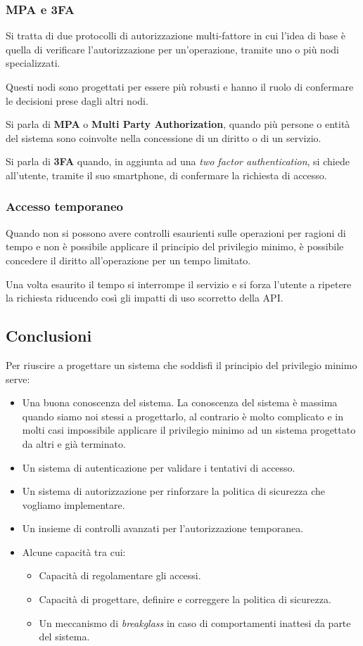 \subsubsection{MPA e 3FA}
Si tratta di due protocolli di autorizzazione multi-fattore in cui l'idea di base è quella di verificare
l'autorizzazione per un'operazione, tramite uno o più nodi specializzati.

Questi nodi sono progettati per essere più robusti e hanno il ruolo di confermare le decisioni prese dagli altri nodi.

Si parla di \textbf{MPA} o \textbf{Multi Party Authorization}, quando più persone o entità del sistema sono coinvolte
nella concessione di un diritto o di un servizio.

Si parla di \textbf{3FA} quando, in aggiunta ad una \emph{two factor authentication}, si chiede all'utente, tramite il
suo smartphone, di confermare la richiesta di accesso.

\subsubsection{Accesso temporaneo}
Quando non si possono avere controlli esaurienti sulle operazioni per ragioni di tempo e non è possibile applicare il
principio del privilegio minimo, è possibile concedere il diritto all'operazione per un tempo limitato.

Una volta esaurito il tempo si interrompe il servizio e si forza l'utente a ripetere la richiesta riducendo così gli
impatti di uso scorretto della API.

\subsection{Conclusioni}
Per riuscire a progettare un sistema che soddisfi il principio del privilegio minimo serve:
\begin{itemize}
	\item Una buona conoscenza del sistema. La conoscenza del sistema è massima quando siamo noi stessi a progettarlo,
	      al contrario è molto complicato e in molti casi impossibile applicare il privilegio minimo ad un sistema
	      progettato da altri e già terminato.
	\item Un sistema di autenticazione per validare i tentativi di accesso.
	\item Un sistema di autorizzazione per rinforzare la politica di sicurezza che vogliamo implementare.
	\item Un insieme di controlli avanzati per l'autorizzazione temporanea.
	\item Alcune capacità tra cui:
	      \begin{itemize}
		      \item Capacità di regolamentare gli accessi.
		      \item Capacità di progettare, definire e correggere la politica di sicurezza.
		      \item Un meccanismo di \emph{breakglass} in caso di comportamenti inattesi da parte del sistema.
	      \end{itemize}
\end{itemize}

